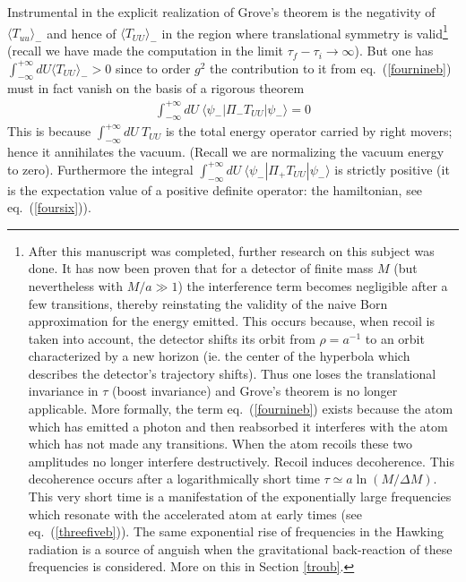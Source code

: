 \documentclass[12pt,oneside]{report}
\def\elematrice#1#2#3{\langle #1|#2|#3 \rangle}
\begin{document}
Instrumental in the explicit realization of Grove's theorem is the negativity
of $\langle T_{uu} \rangle_-$ and hence of $\langle T_{UU} \rangle_-$ in the
 region where translational symmetry is valid\footnote{
After this manuscript was completed, further research on this
subject was done. 
It has now been proven  \cite{Par} 
that for a detector of finite mass $M$ (but nevertheless
with $M/a \gg 1$) the interference term becomes 
negligible after a few transitions,
thereby reinstating the validity of the naive Born approximation for the energy
emitted. This occurs because, when recoil 
is taken into account, the detector shifts its
orbit from $\rho=a^{-1}$ to an orbit characterized by a new horizon (ie. 
the center of
the hyperbola which describes the detector's trajectory shifts). Thus one loses the
translational invariance in $\tau$ (boost invariance) and Grove's theorem is no longer
applicable. More formally, the term eq.~(\ref{fournineb}) exists because the
atom which has emitted a photon and then reabsorbed it interferes with the atom
which has not made any transitions. When 
the atom recoils these two amplitudes  no longer interfere destructively.
Recoil induces decoherence. This decoherence occurs
after a logarithmically short time 
$ \tau \simeq a \ln ( M / \Delta M) $. This very short time is a manifestation of the exponentially
large frequencies which resonate with the accelerated atom 
at early times (see eq.~(\ref{threefiveb})). 
The same exponential rise of frequencies in the Hawking radiation
is a source of anguish when the gravitational back-reaction of these
frequencies is considered. More on this in Section \ref{troub}.}  (recall
we have made the computation in the limit $\tau_f-\tau_i \to \infty$). But 
one has
$\int_{-\infty}^{+\infty}  dU \langle T_{UU} \rangle_- > 0$ 
since to order $g^2$ the contribution to it from eq.~(\ref{fournineb}) must in
fact vanish  on the basis of a
rigorous theorem 
\begin{eqnarray}
\int_{-\infty}^{+ \infty} \! dU \ \elematrice{\psi_-}{\Pi_-
T_{UU}}{\psi_-} =0
\label{sixnine}
\end{eqnarray}
This is because 
$\int_{-\infty}^{+ \infty} \! dU \ 
T_{UU}$
is the total energy operator carried by right movers; hence it
annihilates the vacuum. (Recall we are normalizing the vacuum energy to
zero).
Furthermore the integral 
$\int_{-\infty}^{+ \infty} \! dU \
\elematrice{\psi_-}{\Pi_+T_{UU}}{\psi_-}$ is strictly positive (it 
is the expectation value of a positive definite operator:
the hamiltonian, see eq.~(\ref{foursix})).
\end{document}
